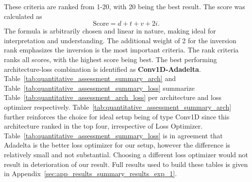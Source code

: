 These criteria are ranked from 1-20, with 20 being the best result. The score was calculated as
\begin{equation}
    \text{Score} = d+t+v+2i.
\end{equation} 
The formula is arbitrarily chosen and linear in nature, making ideal for interpretation and understanding. The additional weight of 2 for the inversion rank emphasizes the inversion is the most important criteria. The rank criteria ranks all scores, with the highest score being best. The best performing architecture-loss combination is identified as \textbf{Conv1D-Adadelta}. Table~\ref{tab:quantitative_assessment_summary_arch} and Table~\ref{tab:quantitative_assessment_summary_loss} summarize Table~\ref{tab:quantitative_assessment_arch_loss} per architecture and loss optimizer respectively. Table~\ref{tab:quantitative_assessment_summary_arch} further reinforces the choice for ideal setup being of type Conv1D since this architecture ranked in the top four, irrespective of Loss Optimizer. Table~\ref{tab:quantitative_assessment_summary_loss} is in agreement that Adadelta is the better loss optimizer for our setup, however the difference is relatively small and not substantial. Choosing a different loss optimizer would not result in deterioration of our result. Full results used to build these tables is given in Appendix~\ref{sec:app_results_summary_results_exp_1}.

